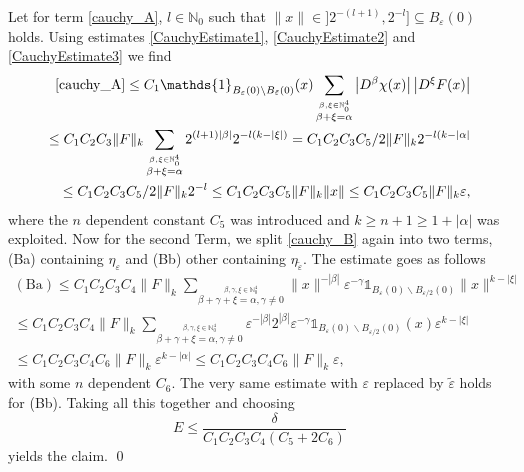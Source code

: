 \documentclass[oneside,reqno,12pt]{amsart}
\begin{document}
Let for term \eqref{cauchy_A}, \(l\in \mathbb{N}_0\) such that \(\|x\|\in ]2^{-(l+1)},2^{-l}] \subseteq B_\varepsilon(0)\) holds. Using estimates \eqref{CauchyEstimate1}, \eqref{CauchyEstimate2} and \eqref{CauchyEstimate3} we find
\begin{align*}
\eqref{cauchy_A} \le C_1 \mathds{1}_{B_\varepsilon(0)\backslash B_{\tilde{\varepsilon}}(0)}(x) \sum_{\stackrel{\beta,\xi\in\mathbb{N}^4_0}{\beta+\xi=\alpha}}  \left| D^\beta \chi(x)\right| \left| D^\xi F(x)\right|\\
\le C_1C_2 C_3 \|F\|_k \sum_{\stackrel{\beta,\xi\in\mathbb{N}^4_0}{\beta+\xi=\alpha}} 2^{(l+1)|\beta|} 2^{-l (k-|\xi|)}
=   C_1 C_2 C_3 C_5/2 \|F\|_k 2^{-l (k-|\alpha|} \\
\le  C_1 C_2 C_3 C_5/2 \|F\|_k 2^{-l} \le    C_1 C_2 C_3 C_5 \|F\|_k \|x\| \le  C_1 C_2 C_3 C_5 \|F\|_k \varepsilon,
\end{align*}
where the \(n\) dependent constant \(C_5\) was introduced and \(k\ge n+1 \ge 1+ |\alpha|\) was exploited. 
Now for the second Term, we split \eqref{cauchy_B} again into two terms, (Ba) containing \(\eta_\varepsilon\) and (Bb) other containing \(\eta_{\tilde{\varepsilon}}\). The estimate goes as follows
\begin{align*}
(\text{Ba})\le C_1 C_2 C_3 C_4 \|F\|_k \sum_{\stackrel{\beta,\gamma, \xi\in\mathbb{N}_0^4}{\beta+\gamma+\xi = \alpha,\gamma\neq 0}} \|x\|^{-|\beta|}  \varepsilon^{-\gamma} \mathds{1}_{B_{\varepsilon}(0)\backslash B_{\varepsilon/2}(0)} \|x\|^{k-|\xi|}\\
\le C_1 C_2 C_3 C_4\|F\|_k \sum_{\stackrel{\beta,\gamma, \xi\in\mathbb{N}_0^4}{\beta+\gamma+\xi = \alpha,\gamma\neq 0}} \varepsilon^{-|\beta|} 2^{|\beta|}  \varepsilon^{-\gamma} \mathds{1}_{B_{\varepsilon}(0)\backslash B_{\varepsilon/2}(0)}(x) \varepsilon^{k-|\xi|}\\
\le C_1 C_2 C_3 C_4 C_6 \|F\|_k \varepsilon^{k-|\alpha|}\le  C_1 C_2 C_3 C_4 C_6 \|F\|_k \varepsilon,
\end{align*}
with some \(n\) dependent \(C_6\). The very same estimate with \(\varepsilon\) replaced by \(\tilde{\varepsilon}\) holds for (Bb). Taking all this together and choosing 
\begin{equation}
E\le \frac{\delta}{C_1 C_2 C_3 C_4 (C_5+2C_6)}
\end{equation}
yields the claim. \qed
\end{document}

